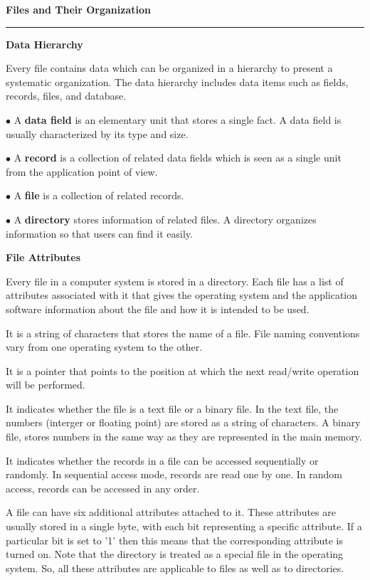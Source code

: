 {\bf Files and Their Organization}
\vskip 1mm
\hrule

\vskip 3mm
{\bf Data Hierarchy}

\vskip 1mm
Every file contains data which can be organized in a hierarchy to present a systematic organization. The data hierarchy includes data items such as fields, records, files, and database.

\vskip 3mm
\qquad$\bullet$ A {\bf data field} is an elementary unit that stores a single fact. A data field is usually characterized by its type and size.

\vskip 3mm
\qquad$\bullet$ A {\bf record} is a collection of related data fields which is seen as a single unit from the application point of view.

\vskip 3mm
\qquad$\bullet$ A {\bf file} is a collection of related records.

\vskip 3mm
\qquad$\bullet$ A {\bf directory} stores information of related files. A directory organizes information so that users can find it easily.

\vskip 1cm
{\bf File Attributes}

\vskip 1mm
Every file in a computer system is stored in a directory. Each file has a list of attributes associated with it that gives the operating system and the application software information about the file and how it is intended to be used.

\vskip 3mm
 It is a string of characters that stores the name of a file. File naming conventions vary from one operating system to the other.

\vskip 3mm
 It is a pointer that points to the position at which the next read/write operation will be performed.

\vskip 3mm
 It indicates whether the file is a text file or a binary file. In the text file, the numbers (interger or floating point) are stored as a string of characters. A binary file, stores numbers in the same way as they are represented in the main memory.

\vskip 3mm
 It indicates whether the records in a file can be accessed sequentially or randomly. In sequential access mode, records are read one by one. In random access, records can be accessed in any order.

\vskip 3mm
 A file can have six additional attributes attached to it. These attributes are usually stored in a single byte, with each bit representing a specific attribute. If a particular bit is set to '1' then this means that the corresponding attribute is turned on. Note that the directory is treated as a special file in the operating system. So, all these attributes are applicable to files as well as to directories.

